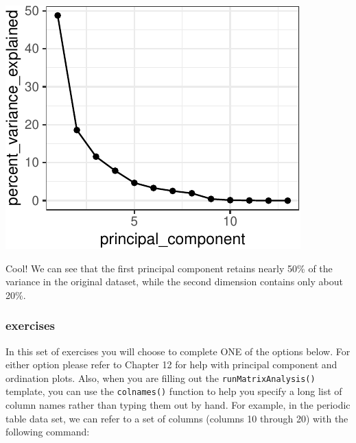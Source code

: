 \documentclass[
]{krantz}
\begin{document}
\begin{center}\includegraphics[width=0.8\linewidth]{index_files/figure-latex/unnamed-chunk-99-1} \end{center}

Cool! We can see that the first principal component retains nearly 50\% of the variance in the original dataset, while the second dimension contains only about 20\%.

\hypertarget{exercises-4}{%
\subsubsection{exercises}\label{exercises-4}}

In this set of exercises you will choose to complete ONE of the options below. For either option please refer to Chapter 12 for help with principal component and ordination plots. Also, when you are filling out the \texttt{runMatrixAnalysis()} template, you can use the \texttt{colnames()} function to help you specify a long list of column names rather than typing them out by hand. For example, in the periodic table data set, we can refer to a set of columns (columns 10 through 20) with the following command:
\end{document}
